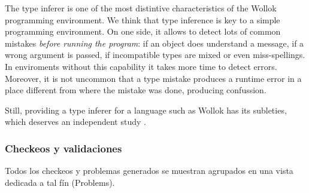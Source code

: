 
\medskip
The type inferer is one of the most distintive characteristics of the Wollok programming environment.
We think that type inference is key to a simple programming environment.
On one side, it allows to detect lots of common mistakes \emph{before running the program}:
if an object does understand a message, if a wrong argument is passed, if incompatible types are mixed or even miss-spellings.
In enviroments without this capability it takes more time to detect errors.
Moreover, it is not uncommon that a type mistake produces a runtime error in a place different from where the mistake was done, producing confussion.

Still, providing a type inferer for a language such as Wollok has its subleties, which deserves an independent study \cite{type inferer}.

\subsubsection{Checkeos y validaciones}
 
Todos los checkeos y problemas
generados se muestran agrupados en una vista dedicada a tal fín (Problems).

